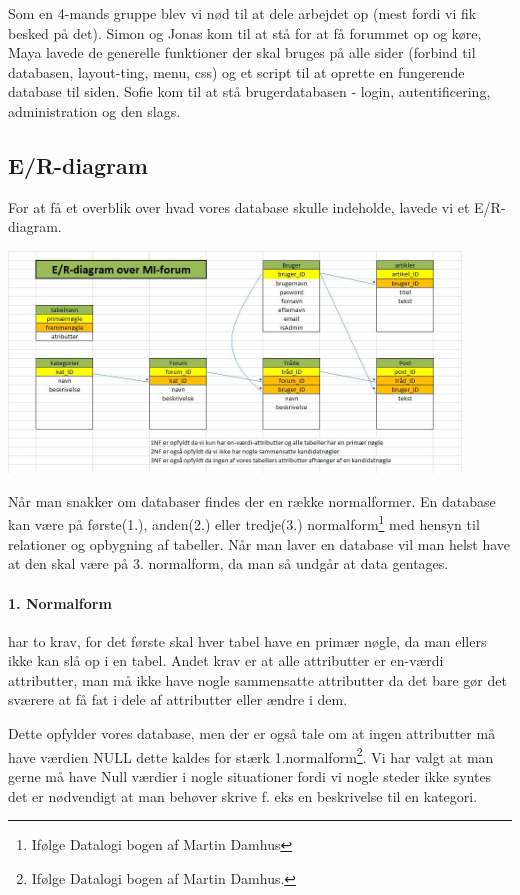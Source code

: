 \documentclass{article}
\begin{document}
Som en 4-mands gruppe blev vi nød til at dele arbejdet op (mest fordi vi fik besked på det). Simon og Jonas kom til at stå for at få forummet op og køre, Maya lavede de generelle funktioner der skal bruges på alle sider (forbind til databasen, layout-ting, menu, css) og et script til at oprette en fungerende database til siden. Sofie kom til at stå brugerdatabasen - login, autentificering, administration og den slags.

\subsection{E/R-diagram}
For at få et overblik over hvad vores database skulle indeholde, lavede vi et E/R-diagram.

\includegraphics[width=120mm]{er-diag.jpg}

Når man snakker om databaser findes der en række normalformer. En database kan være på første(1.), anden(2.) eller tredje(3.) normalform\footnote{Ifølge Datalogi bogen af Martin Damhus} med hensyn til relationer og opbygning af tabeller. Når man laver en database vil man helst have at den skal være på 3. normalform, da man så undgår at data gentages.

\paragraph{1. Normalform}
har to krav, for det første skal hver tabel have en primær nøgle, da man ellers ikke kan slå op i en tabel. Andet krav er at alle attributter er en-værdi attributter, man må ikke have nogle sammensatte attributter da det bare gør det sværere at få fat i dele af attributter eller ændre i dem.

Dette opfylder vores database, men der er også tale om at ingen attributter må have værdien NULL dette kaldes for stærk 1.normalform\footnote{Ifølge Datalogi bogen af Martin Damhus.}. Vi har valgt at man gerne må have Null værdier i nogle situationer fordi vi nogle steder ikke syntes det er nødvendigt at man behøver skrive f. eks en beskrivelse til en kategori.
\end{document}
